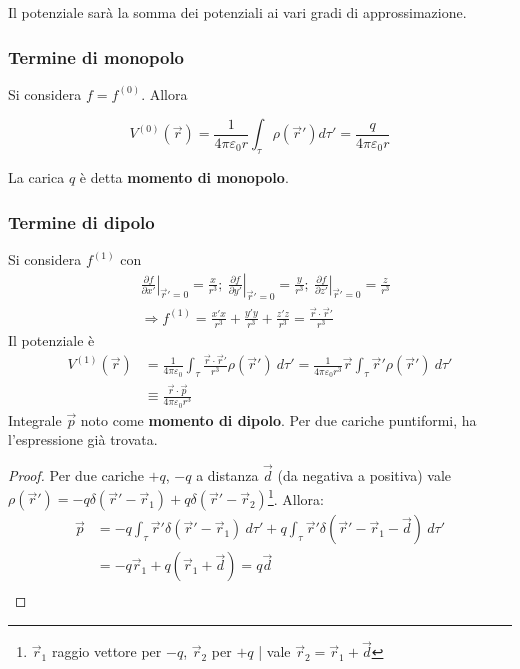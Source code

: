 \documentclass[10pt, a4paper]{scrartcl}
\newcommand*\Eval[3]{\left.#1\right\rvert_{#2}^{#3}}
\numberwithin{equation}{subsection}
\theoremstyle{style1}
\newenvironment{boxenv}[1][]{
    \begin{eqbox}[#1]
    }{
   \end{eqbox}
}
\begin{document}
\noindent Il potenziale sar\`a la somma dei potenziali ai vari gradi di approssimazione. 

\subsubsection{Termine di monopolo}
Si considera $f=f^{(0)} $. Allora
\begin{boxenv}[]
\begin{equation}
	V^{(0)} (\vec{r}) = \frac{1}{4 \pi \varepsilon _0 r}\int_{\tau } \rho (\vec{r}') d\tau '= \frac{q}{4\pi\varepsilon _0r}
\end{equation}
\end{boxenv}
\noindent La carica $q$ \`e detta \textbf{momento di monopolo}.

\subsubsection{Termine di dipolo}

Si considera $f^{(1)} $ con
\begin{equation}
	\begin{split}
		&\Eval{\frac{\partial f}{\partial x'} }{\vec{r}'=0}{} = \frac{x}{r^3}; \ \Eval{\frac{\partial f}{\partial y'} }{\vec{r}'=0}{} = \frac{y}{r^3}; \ \Eval{\frac{\partial f}{\partial z'} }{\vec{r}'=0}{} = \frac{z}{r^3}\\
		&\Rightarrow f^{(1)} = \frac{x'x}{r^3} + \frac{y'y}{r^3} + \frac{z'z}{r^3} = \frac{\vec{r}\cdot \vec{r}' }{r^3}
	\end{split}
\end{equation}
Il potenziale \`e
\begin{equation}
	\begin{split}
		V^{(1)} (\vec{r}) &= \frac{1}{4 \pi \varepsilon _0} \int_{\tau } \frac{\vec{r}\cdot \vec{r}'}{r^3}\rho (\vec{r}') \ d\tau '= \frac{1}{4\pi \varepsilon _0 r^3}\vec{r} \int_{\tau } \vec{r}' \rho (\vec{r}') \ d\tau '\\
				  &\equiv \frac{\vec{r}\cdot \vec{p}}{4\pi \varepsilon _0r^3}
	\end{split}
\end{equation}
Integrale $\vec{p}$ noto come \textbf{momento di dipolo}. Per due cariche puntiformi, ha l'espressione gi\`a trovata.
\begin{boxenv}[]
\begin{proof}
	Per due cariche $+q$, $-q$ a distanza $\vec{d}$ (da negativa a positiva) vale $\rho (\vec{r}') = -q \delta (\vec{r}' - \vec{r}_1) + q \delta (\vec{r}'-\vec{r}_2)$\footnote{$\vec{r}_1$ raggio vettore per $-q$, $\vec{r}_2$ per $+q$ | vale $\vec{r}_2 = \vec{r}_1 +\vec{d}$}. Allora:
	\begin{equation}
		\begin{split}
			\vec{p}&= -q \int_{\tau } \vec{r}' \delta (\vec{r}' - \vec{r}_1) \ d\tau ' + q \int_{\tau } \vec{r}' \delta (\vec{r}' - \vec{r}_1 - \vec{d}) \ d\tau ' \\
			&= -q \vec{r}_1 + q (\vec{r}_1 + \vec{d}) = q \vec{d} \\
		\end{split}
	\end{equation}
\end{proof}
\end{boxenv}
\end{document}

